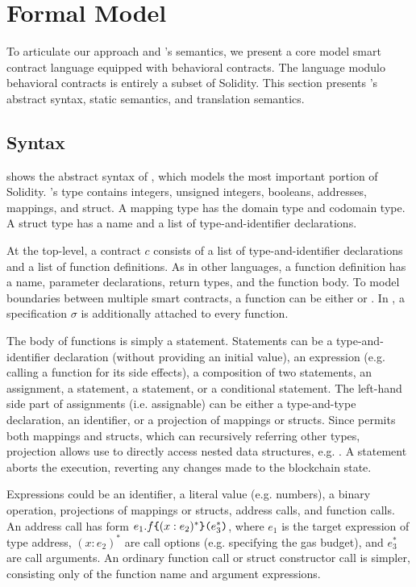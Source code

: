 \section{Formal Model} \label{sec:model}

To articulate our approach and \lang's semantics, we present a core model
smart contract language \corelang equipped with
behavioral contracts. The language modulo behavioral
contracts is entirely a subset of Solidity.
This section presents \corelang's abstract syntax, static semantics, and
translation semantics.



\subsection{Syntax}

 shows the abstract syntax of \corelang,
which models the most important portion of Solidity.
\corelang's type contains integers, unsigned integers, booleans,
addresses, mappings, and struct.
A mapping type has the domain type and codomain type.
A struct type has a name and a list of type-and-identifier declarations.

At the top-level, a contract $c$ consists of a list of type-and-identifier
declarations and a list of function definitions.  As in other languages, a
function definition has a name, parameter declarations, return types, and the
function body.  To model boundaries between multiple smart contracts, a
function can be either  or .
In \corelang, a specification $\sigma$ is additionally attached to every function.

The body of functions is simply a statement.
Statements can be a type-and-identifier declaration (without providing an initial
value), an expression (e.g. calling a function for its side effects), a
composition of two statements, an assignment, a  statement, a  statement,
or a conditional statement.
The left-hand side part of assignments (i.e. assignable) can be either
a type-and-type declaration, an identifier, or a projection of mappings or structs.
Since \corelang permits both mappings and structs, which can recursively referring
other types, projection allows use to directly access nested data structures,
e.g. .
A  statement aborts the execution, reverting any changes made to
the blockchain state.

Expressions could be an identifier, a literal value (e.g. numbers), a binary
operation, projections of mappings or structs, address calls, and function calls.
An address call has form $e_1.f\texttt{\{}(x: e_2)^*\texttt{\}(}e_3^*\texttt{)}$,
where $e_1$ is the target expression of type address,
$(x: e_2)^*$ are call options (e.g. specifying the gas budget),
and $e_3^*$ are call arguments.
An ordinary function call or struct constructor call is simpler, consisting
only of the function name and argument expressions.

